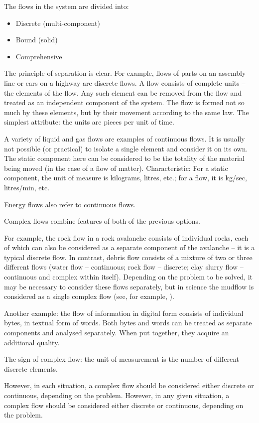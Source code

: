 \documentclass[a4paper,11pt]{article}
\begin{document}
The flows in the system are divided into:
\begin{itemize}
\item Discrete (multi-component)
\item Bound (solid)
\item Comprehensive
\end{itemize}
The principle of separation is clear. For example, flows of parts on an
assembly line or cars on a highway are discrete flows. A flow consists of
complete units -- the elements of the flow. Any such element can be removed
from the flow and treated as an independent component of the system. The flow
is formed not so much by these elements, but by their movement according to
the same law. The simplest attribute: the units are pieces per unit of time.

A variety of liquid and gas flows are examples of continuous flows. It is
usually not possible (or practical) to isolate a single element and consider
it on its own. The static component here can be considered to be the totality
of the material being moved (in the case of a flow of matter). Characteristic:
For a static component, the unit of measure is kilograms, litres, etc.; for a
flow, it is kg/sec, litres/min, etc.

Energy flows also refer to continuous flows.

Complex flows combine features of both of the previous options.

For example, the rock flow in a rock avalanche consists of individual rocks,
each of which can also be considered as a separate component of the avalanche
-- it is a typical discrete flow. In contrast, debris flow consists of a
mixture of two or three different flows (water flow -- continuous; rock flow
-- discrete; clay slurry flow -- continuous and complex within itself).
Depending on the problem to be solved, it may be necessary to consider these
flows separately, but in science the mudflow is considered as a single complex
flow (see, for example, \cite{B18}).

Another example: the flow of information in digital form consists of
individual bytes, in textual form of words. Both bytes and words can be
treated as separate components and analysed separately. When put together,
they acquire an additional quality.

The sign of complex flow: the unit of measurement is the number of different
discrete elements.

However, in each situation, a complex flow should be considered either
discrete or continuous, depending on the problem. However, in any given
situation, a complex flow should be considered either discrete or continuous,
depending on the problem.
\end{document}
